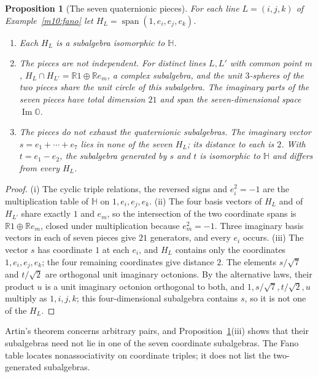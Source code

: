 \documentclass[11pt,reqno]{amsart}
\newtheorem{proposition}[theorem]{Proposition}
\theoremstyle{definition}
\theoremstyle{remark}
\numberwithin{equation}{section}
\newcommand{\R}{\mathbb{R}}
\newcommand{\HH}{\mathbb{H}}
\newcommand{\im}{\operatorname{Im}}
\begin{document}
\begin{proposition}[The seven quaternionic pieces]\label{m10:pieces}
For each line \(L=(i,j,k)\) of Example~\ref{m10:fano} let
\(H_L=\operatorname{span}(1,e_i,e_j,e_k)\).
\begin{enumerate}[label=(\roman*)]
\item Each \(H_L\) is a subalgebra isomorphic to \(\HH\).
\item The pieces are not independent. For distinct lines \(L,L'\) with
common point \(m\), \(H_L\cap H_{L'}=\R1\oplus\R e_m\), a complex
subalgebra, and the unit \(3\)-spheres of the two pieces share the unit
circle of this subalgebra. The imaginary parts of the seven pieces have
total dimension \(21\) and span the seven-dimensional space
\(\im\mathbb O\).
\item The pieces do not exhaust the quaternionic subalgebras. The
imaginary vector \(s=e_1+\cdots+e_7\) lies in none of the seven
\(H_L\); its distance to each is \(2\). With \(t=e_1-e_2\), the
subalgebra generated by \(s\) and \(t\) is isomorphic to \(\HH\) and
differs from every \(H_L\).
\end{enumerate}
\end{proposition}

\begin{proof}
(i) The cyclic triple relations, the reversed signs and \(e_i^2=-1\)
are the multiplication table of \(\HH\) on \(1,e_i,e_j,e_k\).
(ii) The four basis vectors of \(H_L\) and of \(H_{L'}\) share exactly
\(1\) and \(e_m\), so the intersection of the two coordinate spans is
\(\R1\oplus\R e_m\), closed under multiplication because \(e_m^2=-1\).
Three imaginary basis vectors in each of seven pieces give \(21\)
generators, and every \(e_i\) occurs. (iii) The vector \(s\) has
coordinate \(1\) at each \(e_i\), and \(H_L\) contains only the
coordinates \(1,e_i,e_j,e_k\); the four remaining coordinates give
distance \(2\). The elements \(s/\sqrt7\) and \(t/\sqrt2\) are
orthogonal unit imaginary octonions. By the alternative laws, their
product \(u\) is a unit imaginary octonion orthogonal to both, and
\(1,s/\sqrt7,t/\sqrt2,u\) multiply as \(1,i,j,k\); this four-dimensional
subalgebra contains \(s\), so it is not one of the \(H_L\).
\end{proof}

Artin's theorem concerns arbitrary pairs, and
Proposition~\ref{m10:pieces}(iii) shows that their subalgebras need not
lie in one of the seven coordinate subalgebras. The Fano table locates
nonassociativity on coordinate triples; it does not list the
two-generated subalgebras.
\end{document}
